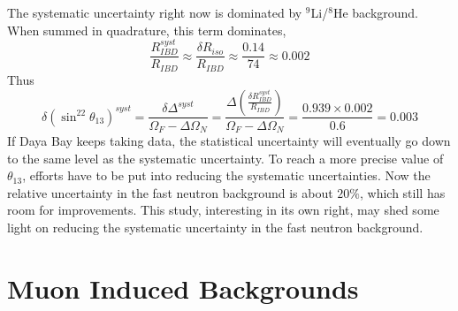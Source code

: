 The systematic uncertainty right now is dominated by $^9$Li/$^8$He background. When summed in quadrature, this term dominates,
\begin{equation}
	\frac{R_{IBD}^{syst}}{R_{IBD}}\approx\frac{\delta R_{iso}}{R_{IBD}}\approx \frac{0.14}{74}\approx 0.002
\end{equation}
Thus
\begin{equation}
	\delta(\sin^22\theta_{13})^{syst}=\frac{\delta\Delta^{syst}}{\Omega_F-\Delta\Omega_N}=\frac{\Delta\left(\frac{\delta R_{IBD}^{syst}}{R_{IBD}}\right)}{\Omega_F-\Delta\Omega_N}=\frac{0.939\times 0.002}{0.6}=0.003
\end{equation}
If Daya Bay keeps taking data, the statistical uncertainty will eventually go down to the same level as the systematic uncertainty. To reach a more precise value of $\theta_{13}$, efforts have to be put into reducing the systematic uncertainties. Now the relative uncertainty in the fast neutron background is about $20\%$, which still has room for improvements. This study, interesting in its own right, may shed some light on reducing the systematic uncertainty in the fast neutron background.





\section{Muon Induced Backgrounds}

